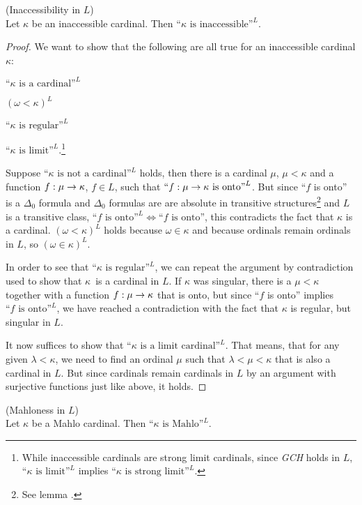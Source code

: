 \begin{theorem}{(Inaccessibility in $L$)}\label{theorem:inaccessible_in_l}\\
Let $\kappa$ be an inaccessible cardinal. Then $\mbox{``$\kappa$ is inaccessible''}^L$.
\end{theorem}
\begin{proof}
We want to show that the following are all true for an inaccessible cardinal $\kappa$:
\bce[(i)] 
\item $\mbox{``$\kappa$ is a cardinal''}^L$
\item $(\omega < \kappa)^L$
\item $\mbox{``$\kappa$ is regular''}^L$
\item $\mbox{``$\kappa$ is limit''}^L$.\footnote{While inaccessible cardinals are strong limit cardinals, since \emph{GCH} holds in $L$, $\mbox{``$\kappa$ is limit''}^L$ 
implies $\mbox{``$\kappa$ is strong limit''}^L$.}
\ece

Suppose $\mbox{``$\kappa$ is not a cardinal''}^L$ holds, then there is a cardinal $\mu$, $\mu < \kappa$ and a function $f:\mu\rightarrow\kappa$, $f \in L$, such that $\mbox{``$f:\mu\rightarrow\kappa$ is onto''}^L$. But since ``$f$ is onto'' is a $\Delta_0$ formula and $\Delta_0$ formulas are are absolute in transitive structures\footnote{See lemma .} and $L$ is a transitive class, $\mbox{``$f$ is onto''}^L \iff \mbox{``$f$ is onto''}$, this contradicts the fact that $\kappa$ is a cardinal.
$(\omega < \kappa)^L$ holds because $\omega \in \kappa$ and because ordinals remain ordinals in $L$, so $(\omega \in \kappa)^L$.

In order to see that $\mbox{``$\kappa$ is regular''}^L$, we can repeat the argument by contradiction used to show that $\kappa$ is a cardinal in $L$. If $\kappa$ was singular, there is a $\mu < \kappa$ together with a function $f: \mu \rightarrow \kappa$ that is onto, but since ``$f$ is onto'' implies $\mbox{``$f$ is onto''}^L$, we have reached a contradiction with the fact that $\kappa$ is regular, but singular in $L$.

It now suffices to show that $\mbox{``$\kappa$ is a limit cardinal''}^L$. That means, that for any given $\lambda<\kappa$, we need to find an ordinal $\mu$ such that $\lambda < \mu < \kappa$ that is also a cardinal in $L$. But since cardinals remain cardinals in $L$ by an argument with surjective functions just like above, it holds.\end{proof}

\begin{theorem}{(Mahloness in $L$)}\label{theorem:mahlo_in_l}\\
Let $\kappa$ be a Mahlo cardinal. Then $\mbox{``$\kappa$ is Mahlo''}^L$.
\end{theorem}

